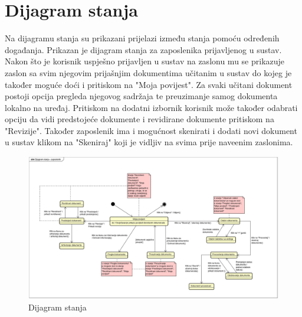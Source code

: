 			
			
			
			\eject
		
		\section{Dijagram stanja}
			
			
			
			
			
			{Na dijagramu stanja su prikazani prijelazi između stanja pomoću određenih događanja. Prikazan je dijagram stanja za zaposlenika prijavljenog u sustav. Nakon što je korisnik uspješno prijavljen u sustav na zaslonu mu se prikazuje zaslon sa svim njegovim prijašnjim dokumentima učitanim u sustav do kojeg je također moguće doći i pritiskom na "Moja povijest". Za svaki učitani dokument postoji opcija pregleda njegovog sadržaja te preuzimanje samog dokumenta lokalno na uređaj. Pritiskom na dodatni izbornik korisnik može također odabrati opciju da vidi predstojeće dokumente i revidirane dokumente pritiskom na "Revizije". Također zaposlenik ima i mogućnost skenirati i dodati novi dokument u sustav klikom na "Skeniraj" koji je vidljiv na svima prije naveenim zaslonima. }
			
			\begin{figure}[H]
				\includegraphics[width=\textwidth]{slike/dijagramStanja-zaposlenik.jpg}
				\caption{Dijagram stanja}
				\label{fig:dijagramStanja}
			\end{figure}
			
